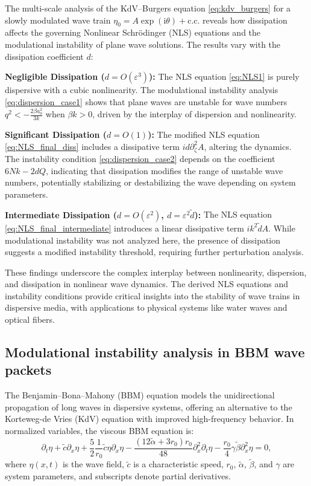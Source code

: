 \documentclass[alpha-refs, 12pt]{wiley-article}
\newcommand{\ui}{\mathrm{i}}
\newcommand{\eps}{\varepsilon}
\begin{document}
The multi-scale analysis of the KdV--Burgers equation \eqref{eq:kdv_burgers} for a slowly modulated wave train $\eta_0 = A \exp(\ui \theta) + \text{c.c.}$ reveals how dissipation affects the governing Nonlinear Schr\"odinger (NLS) equations and the modulational instability of plane wave solutions. The results vary with the dissipation coefficient $d$:

\begin{description}
  \item{\textbf{Negligible Dissipation ($d = O(\eps^3)$):}} The NLS equation \eqref{eq:NLS1} is purely dispersive with a cubic nonlinearity. The modulational instability analysis \eqref{eq:dispersion_case1} shows that plane waves are unstable for wave numbers $q^2 < -\frac{2 \beta a_0^2}{3 k}$ when $\beta k > 0$, driven by the interplay of dispersion and nonlinearity.
  \item{\textbf{Significant Dissipation ($d = O(1)$):}} The modified NLS equation \eqref{eq:NLS_final_diss} includes a dissipative term $i d \partial_\zeta^2 A$, altering the dynamics. The instability condition \eqref{eq:dispersion_case2} depends on the coefficient $6 N k - 2 d Q$, indicating that dissipation modifies the range of unstable wave numbers, potentially stabilizing or destabilizing the wave depending on system parameters.
  \item{\textbf{Intermediate Dissipation ($d = O(\eps^2)$, $d = \eps^2 \tilde{d}$):}} The NLS equation \eqref{eq:NLS_final_intermediate} introduces a linear dissipative term $i k^2 \tilde{d} A$. While modulational instability was not analyzed here, the presence of dissipation suggests a modified instability threshold, requiring further perturbation analysis.
\end{description}
These findings underscore the complex interplay between nonlinearity, dispersion, and dissipation in nonlinear wave dynamics. The derived NLS equations and instability conditions provide critical insights into the stability of wave trains in dispersive media, with applications to physical systems like water waves and optical fibers.

\subsection{Modulational instability analysis in BBM wave packets}

The Benjamin--Bona--Mahony (BBM) equation models the unidirectional propagation of long waves in dispersive systems, offering an alternative to the Korteweg-de Vries (KdV) equation with improved high-frequency behavior. In normalized variables, the viscous BBM equation is:
\begin{equation}\label{eq:BBM1}
  \partial_t \eta + \tilde{c} \partial_x \eta + \frac{5}{2} \frac{1}{r_0} \tilde{c} \eta \partial_x \eta - \frac{(12 \tilde{\alpha} + 3 r_0) r_0}{48} \partial_x^2 \partial_t \eta - \frac{r_0}{4} \gamma \tilde{\beta} \partial_x^2 \eta = 0,
\end{equation}
where $\eta(x,t)$ is the wave field, $\tilde{c}$ is a characteristic speed, $r_0$, $\tilde{\alpha}$, $\tilde{\beta}$, and $\gamma$ are system parameters, and subscripts denote partial derivatives.
\end{document}
